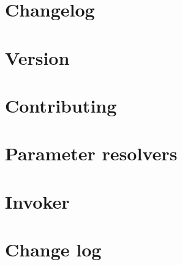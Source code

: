 \documentclass[twoside]{book}
\newcommand{\+}{\discretionary{\mbox{\scriptsize$\hookleftarrow$}}{}{}}
\begin{document}
\chapter{Changelog}
\label{md__c__workspace__proyecto__p_h_p_project_vendor_phar_io_version__c_h_a_n_g_e_l_o_g}

\chapter{Version}
\label{md__c__workspace__proyecto__p_h_p_project_vendor_phar_io_version__r_e_a_d_m_e}

\chapter{Contributing}
\label{md__c__workspace__proyecto__p_h_p_project_vendor_php_di_invoker__c_o_n_t_r_i_b_u_t_i_n_g}

\chapter{Parameter resolvers}
\label{md__c__workspace__proyecto__p_h_p_project_vendor_php_di_invoker_doc_parameter_resolvers}

\chapter{Invoker}
\label{md__c__workspace__proyecto__p_h_p_project_vendor_php_di_invoker__r_e_a_d_m_e}

\chapter{Change log}
\label{md__c__workspace__proyecto__p_h_p_project_vendor_php_di_php_di_change_log}

\end{document}
